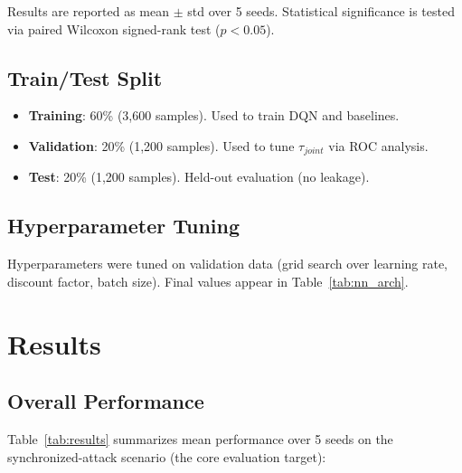\documentclass[conference]{IEEEtran}
\begin{document}
Results are reported as mean $\pm$ std over 5 seeds. Statistical significance is tested via paired Wilcoxon signed-rank test ($p < 0.05$).

\subsection{Train/Test Split}

\begin{itemize}
\item \textbf{Training}: 60\% (3,600 samples). Used to train DQN and baselines.
\item \textbf{Validation}: 20\% (1,200 samples). Used to tune $\tau_{joint}$ via ROC analysis.
\item \textbf{Test}: 20\% (1,200 samples). Held-out evaluation (no leakage).
\end{itemize}

\subsection{Hyperparameter Tuning}

Hyperparameters were tuned on validation data (grid search over learning rate, discount factor, batch size). Final values appear in Table~\ref{tab:nn_arch}.

\section{Results}\label{sec:results}

\subsection{Overall Performance}

Table~\ref{tab:results} summarizes mean performance over 5 seeds on the synchronized-attack scenario (the core evaluation target):
\end{document}
